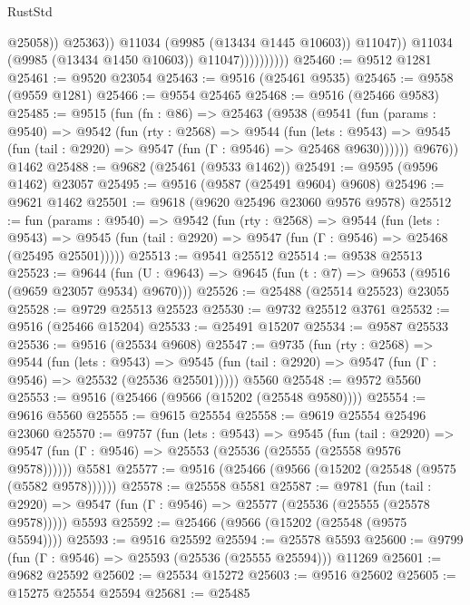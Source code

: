 \begin{lexlean}{RustStd}
\begin{coremodule}
                                    @25058))
                                @25363))
                            @11034
                            (@9985 (@13434 @1445 @10603))
                            @11047))
                        @11034
                        (@9985 (@13434 @1450 @10603))
                        @11047))))))))))
@25460 := @9512 @1281
@25461 := @9520 @23054
@25463 := @9516 (@25461 @9535)
@25465 := @9558 (@9559 @1281)
@25466 := @9554 @25465
@25468 := @9516 (@25466 @9583)
@25485 := @9515
    (fun (fn : @86) =>
    @25463
      (@9538
        (@9541
          (fun (params : @9540) =>
          @9542
            (fun (rty : @2568) =>
            @9544
              (fun (lets : @9543) =>
              @9545 (fun (tail : @2920) => @9547 (fun (Γ : @9546) => @25468 @9630))))))
        @9676))
    @1462
@25488 := @9682 (@25461 (@9533 @1462))
@25491 := @9595 (@9596 @1462) @23057
@25495 := @9516 (@9587 (@25491 @9604) @9608)
@25496 := @9621 @1462
@25501 := @9618 (@9620 @25496 @23060 @9576 @9578)
@25512 := fun (params : @9540) =>
  @9542
    (fun (rty : @2568) =>
    @9544
      (fun (lets : @9543) =>
      @9545 (fun (tail : @2920) => @9547 (fun (Γ : @9546) => @25468 (@25495 @25501)))))
@25513 := @9541 @25512
@25514 := @9538 @25513
@25523 := @9644
    (fun (U : @9643) => @9645 (fun (t : @7) => @9653 (@9516 (@9659 @23057 @9534) @9670)))
@25526 := @25488 (@25514 @25523) @23055
@25528 := @9729 @25513 @25523
@25530 := @9732 @25512 @3761
@25532 := @9516 (@25466 @15204)
@25533 := @25491 @15207
@25534 := @9587 @25533
@25536 := @9516 (@25534 @9608)
@25547 := @9735
    (fun (rty : @2568) =>
    @9544
      (fun (lets : @9543) =>
      @9545 (fun (tail : @2920) => @9547 (fun (Γ : @9546) => @25532 (@25536 @25501)))))
    @5560
@25548 := @9572 @5560
@25553 := @9516 (@25466 (@9566 (@15202 (@25548 @9580))))
@25554 := @9616 @5560
@25555 := @9615 @25554
@25558 := @9619 @25554 @25496 @23060
@25570 := @9757
    (fun (lets : @9543) =>
    @9545
      (fun (tail : @2920) =>
      @9547 (fun (Γ : @9546) => @25553 (@25536 (@25555 (@25558 @9576 @9578))))))
    @5581
@25577 := @9516 (@25466 (@9566 (@15202 (@25548 (@9575 (@5582 @9578))))))
@25578 := @25558 @5581
@25587 := @9781
    (fun (tail : @2920) => @9547 (fun (Γ : @9546) => @25577 (@25536 (@25555 (@25578 @9578)))))
    @5593
@25592 := @25466 (@9566 (@15202 (@25548 (@9575 @5594))))
@25593 := @9516 @25592
@25594 := @25578 @5593
@25600 := @9799 (fun (Γ : @9546) => @25593 (@25536 (@25555 @25594))) @11269
@25601 := @9682 @25592
@25602 := @25534 @15272
@25603 := @9516 @25602
@25605 := @15275 @25554 @25594
@25681 := @25485

\end{coremodule}
\end{lexlean}
